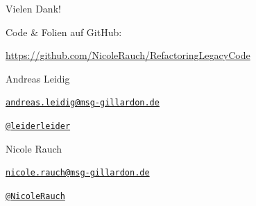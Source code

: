 {
\begin{frame}{Vielen Dank!}

        Code \& Folien auf GitHub:
        \begin{center}
                \url{https://github.com/NicoleRauch/RefactoringLegacyCode}
        \end{center}

        \begin{block}{Andreas Leidig}
        \begin{description}[Twitterxx]
                \item[E-Mail]  \href{mailto:andreas.leidig@msg-gillardon.de}{\texttt{andreas.leidig@msg-gillardon.de}}
                \item[Twitter] \href{http://twitter.com/leiderleider}{\texttt{@leiderleider}}
        \end{description}
        \end{block}

        \begin{block}{Nicole Rauch}
        \begin{description}[Twitterxx]
                \item[E-Mail]  \href{mailto:nicole.rauch@msg-gillardon.de}{\texttt{nicole.rauch@msg-gillardon.de}}
                \item[Twitter] \href{http://twitter.com/NicoleRauch}{\texttt{@NicoleRauch}}
        \end{description}
        \end{block}
\end{frame}
}

